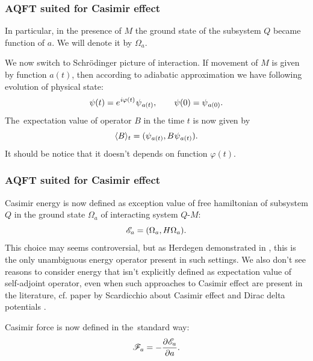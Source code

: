 \documentclass[10pt,t]{beamer}
\begin{document}
\begin{frame}
  \frametitle{AQFT suited for Casimir effect}


  In particular, in the presence of $M$ the ground state of the subsystem
  $Q$ became function of $a$. We will denote it by $\Omega_{ a }$.

  We now switch to Schr\"{o}dinger picture of interaction. If movement of
  $M$ is given by function $a( t )$, then according to adiabatic
  approximation we have following evolution of physical state:
  \begin{equation}
    \label{eq:Formalizm-algebraiczny-dla-efektu-Casimira-12}
    \psi( t ) =
    e^{ \hspace{0.05em} i \varphi( t ) } \hspace{0.05em} \psi_{ \hspace{0.05em} a( t ) }, \qquad
    \psi( 0 ) = \psi_{ \hspace{0.05em} a( 0 ) }.
  \end{equation}
  The~expectation value of operator $B$ in the time $t$ is now given by
  \begin{equation}
    \label{eq:Epstein-Glaser-24-A}
    \langle B \rangle_{ t } =
    ( \psi_{ \hspace{0.05em} a( t ) }, B \hspace{0.05em} \psi_{ \hspace{0.05em} a( t ) } ).
  \end{equation}
  It should be notice that it doesn't depends on function $\varphi( t )$.

\end{frame}





\begin{frame}
  \frametitle{AQFT suited for Casimir effect}


  Casimir energy is now defined as exception value of \alert{free}
  hamiltonian of subsystem $Q$ in the ground state $\Omega_{ a }$ of interacting
  system $Q\text{-}M$:
  \begin{equation}
    \label{eq:Epstein-Glaser-24-A}
    \mathcal{E}_{ a } = ( \Omega_{ a }, H \Omega_{ a } ).
  \end{equation}
  This choice may seems controversial, but as Herdegen demonstrated in
  \parencite{Herdegen-Quantum-backreaction-ETC-Part-I-Pub-2005}, this is
  the only unambiguous energy operator present in such settings. We also
  don't see reasons to consider energy that isn't explicitly defined as
  expectation value of self-adjoint operator, even when such approaches to
  Casimir effect are present in the literature, cf. paper by Scardicchio
  about Casimir effect and Dirac delta potentials
  \parencite{Scardicchio-Casimir-dynamics-ETC-2005}.

  Casimir force is now defined in the~standard way:
  \begin{equation}
    \label{eq:Epstein-Glaser-24-A}
    \mathcal{F}_{ a } = -\frac{ \partial \mathcal{E}_{ a } }{ \partial a }.
  \end{equation}

\end{frame}
\end{document}
